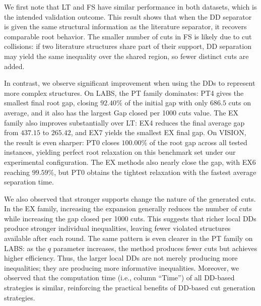 

We first note that LT and FS have similar performance in both datasets, which is the intended validation outcome. This result shows that when the DD separator is given the same structural information as the literature separator, it recovers comparable root behavior. The smaller number of cuts in FS is likely due to cut collisions: if two literature structures share part of their support, DD separation may yield the same inequality over the shared region, so fewer distinct cuts are added.

In contrast, we observe significant improvement when using the DDs to represent more complex structures.  On LABS, the PT family dominates: PT4 gives the smallest final root gap, closing $92.40\%$ of the initial gap with only $686.5$ cuts on average, and it also has the largest Gap closed per 1000 cuts value. The EX family also improves substantially over LT: EX4 reduces the final average gap from $437.15$ to $265.42$, and EX7 yields the smallest EX final gap. On VISION, the result is even sharper: PT0 closes $100.00\%$ of the root gap across all tested instances, yielding perfect root relaxation on this benchmark set under our experimental configuration. The EX methods also nearly close the gap, with EX6 reaching $99.59\%$, but PT0 obtains the tightest relaxation with the fastest average separation time. 

We also observed that stronger supports change the nature of the generated cuts. In the EX family, increasing the expansion generally reduces the number of cuts while increasing the gap closed per 1000 cuts. This suggests that richer local DDs produce stronger individual inequalities, leaving fewer violated structures available after each round. The same pattern is even clearer in the PT family on LABS: as the $q$ parameter increases, the method produces fewer cuts but achieves higher efficiency. Thus, the larger local DDs are not merely producing more inequalities; they are producing more informative inequalities. Moreover, we observed that the computation time (i.e., column ``Time'') of all DD-based strategies is similar, reinforcing the practical benefits of DD-based cut generation strategies. 




